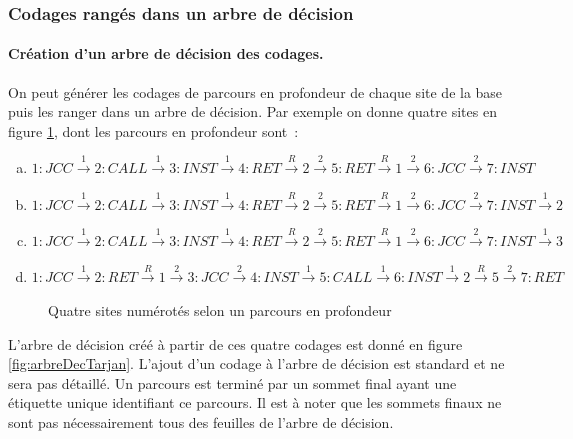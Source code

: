 \subsubsection{Codages rangés dans un arbre de décision}
\paragraph{Création d'un arbre de décision des codages.}
On peut générer les codages de parcours en profondeur de chaque site de la base puis les ranger dans un arbre de décision. Par exemple on donne quatre sites en figure \ref{fig:troisProf}, dont les parcours en profondeur sont~:
\begin{enumerate}[(a) \textthreequartersemdash]
 \item $1: JCC\xrightarrow{1} 2: CALL \xrightarrow{1} 3: INST \xrightarrow{1} 4: RET \xrightarrow{R} 2 \xrightarrow{2} 5: RET \xrightarrow{R} 1 \xrightarrow{2} 6: JCC \xrightarrow{2} 7:INST$
 \item $1: JCC\xrightarrow{1} 2: CALL \xrightarrow{1} 3: INST \xrightarrow{1} 4: RET \xrightarrow{R} 2 \xrightarrow{2} 5: RET \xrightarrow{R} 1 \xrightarrow{2} 6: JCC \xrightarrow{2} 7:INST \xrightarrow{1} 2$
 \item $1: JCC\xrightarrow{1} 2: CALL \xrightarrow{1} 3: INST \xrightarrow{1} 4: RET \xrightarrow{R} 2 \xrightarrow{2} 5: RET \xrightarrow{R} 1 \xrightarrow{2} 6: JCC \xrightarrow{2} 7:INST \xrightarrow{1} 3$
 \item $1: JCC\xrightarrow{1} 2: RET \xrightarrow{R} 1 \xrightarrow{2} 3: JCC \xrightarrow{2} 4: INST \xrightarrow{1} 5: CALL \xrightarrow{1} 6: INST \xrightarrow{1} 2 \xrightarrow{R} 5 \xrightarrow{2} 7: RET$
\end{enumerate}

\begin{figure}[h]
\begin{center}
\end{center}
\caption{Quatre sites numérotés selon un parcours en profondeur}
\label{fig:troisProf}
\end{figure}

L'arbre de décision créé à partir de ces quatre codages est donné en figure \ref{fig:arbreDecTarjan}. L'ajout d'un codage à l'arbre de décision est standard et ne sera pas détaillé.
Un parcours est terminé par un sommet final ayant une étiquette unique identifiant ce parcours.
Il est à noter que les sommets finaux ne sont pas nécessairement tous des feuilles de l'arbre de décision.

